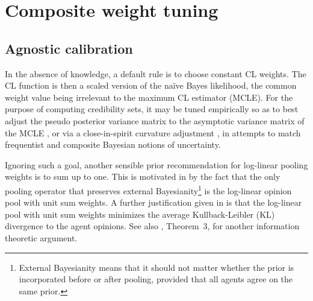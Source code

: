 \documentclass[english]{scrartcl}
\begin{document}





\section{Composite weight tuning}
\label{sec:weight_tuning}

\subsection{Agnostic calibration}

In the absence of knowledge, a default rule is to choose constant CL weights. The CL function is then a scaled version of the na\"ive Bayes likelihood, the common weight value being irrelevant to the maximum CL estimator (MCLE). For the purpose of computing credibility sets, it may be tuned empirically so as to best adjust the pseudo posterior variance matrix to the asymptotic variance matrix of the MCLE \cite{Pauli-11}, or via a close-in-spirit curvature adjustment \cite{Ribatet-12}, in attempts to match frequentist and composite Bayesian notions of uncertainty.

Ignoring such a goal, another sensible prior recommendation for log-linear pooling weights is to sum up to one. This is motivated in \cite{Genest-86b} by the fact that the only pooling operator that preserves external Bayesianity\footnote{External Bayesianity means that it should not matter whether the prior is incorporated before or after pooling, provided that all agents agree on the same prior.} is the log-linear opinion pool with unit sum weights. A further justification given in \cite{Garg-04} is that the log-linear pool with unit sum weights minimizes the average Kullback-Leibler (KL) divergence to the agent opinions. See also \cite{Wang-14}, Theorem~3, for another information theoretic argument.
\end{document}
